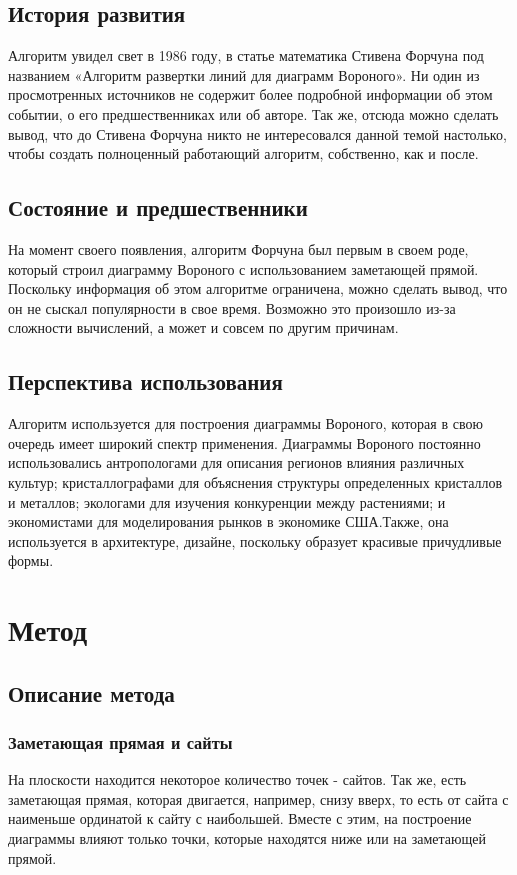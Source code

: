 \documentclass[ a4paper]{article}
\begin{document}
\subsection{История развития}
Алгоритм увидел свет в 1986 году, в статье математика Стивена Форчуна под названием «Алгоритм развертки линий для диаграмм Вороного». Ни один из просмотренных источников не содержит более подробной информации об этом событии, о его предшественниках или об авторе. Так же, отсюда можно сделать вывод, что до Стивена Форчуна никто не интересовался данной темой настолько, чтобы создать полноценный работающий алгоритм, собственно, как и после.

\subsection{Состояние и предшественники}
На момент своего появления, алгоритм Форчуна был первым в своем роде, который строил диаграмму Вороного с использованием заметающей прямой. Поскольку информация об этом алгоритме ограничена, можно сделать вывод, что он не сыскал популярности в свое время. Возможно это произошло из-за сложности вычислений, а может и совсем по другим причинам.

\subsection{Перспектива использования}
Алгоритм используется для построения диаграммы Вороного, которая в свою очередь имеет широкий спектр применения. 
Диаграммы Вороного постоянно использовались антропологами для описания регионов влияния различных культур; кристаллографами для объяснения структуры определенных кристаллов и металлов; экологами для изучения конкуренции между растениями; и экономистами для моделирования рынков в экономике США.Также, она используется в архитектуре, дизайне, поскольку образует красивые причудливые формы. 
\newpage

\section{Метод}
\subsection{Описание метода}

\subsubsection{Заметающая прямая и сайты}
На плоскости находится некоторое количество точек - сайтов. Так же, есть заметающая прямая, которая двигается, например, снизу вверх, то есть от сайта с наименьше ординатой к сайту с наибольшей. Вместе с этим, на построение диаграммы влияют только точки, которые находятся ниже или на заметающей прямой.
\end{document}
